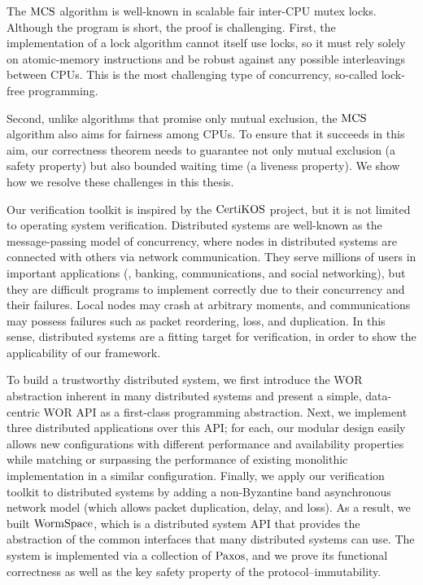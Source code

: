 The $\mathrm{MCS}$ algorithm is well-known in scalable fair inter-CPU mutex locks. 
Although the program is short, the proof is challenging. 
First, the implementation of a lock algorithm cannot itself use locks, so it must rely solely on atomic-memory instructions and be robust against any possible interleavings between CPUs. 
This is the most challenging type of concurrency, so-called lock-free programming. 

Second, unlike algorithms that promise only mutual exclusion, the $\mathrm{MCS}$ algorithm also aims for fairness among CPUs. 
To ensure that it succeeds in this aim, our correctness theorem needs to guarantee not only mutual exclusion (a safety property) but also bounded waiting time (a liveness property). 
We show how we resolve these challenges in this thesis. 

Our verification toolkit is inspired by the $\mathrm{CertiKOS}$ project, 
but it is not limited to operating system verification. 
Distributed systems are well-known as the message-passing model of concurrency, 
where nodes in distributed systems are connected with others via network communication. 
They serve millions of users in important applications (\ie, banking, communications, and social networking), 
but they are difficult programs to implement correctly due to their concurrency and their failures. 
Local nodes may crash at arbitrary moments, and communications may possess failures such as packet reordering, loss, and duplication. 
In this sense, distributed systems are a fitting target for verification, in order to show the applicability of our framework. 

To build a trustworthy distributed system, we first introduce the WOR abstraction inherent in many distributed systems and present a simple, 
data-centric WOR API as a first-class programming abstraction. 
Next, we implement three distributed applications over this API; for each, our modular design easily allows new configurations with different performance and availability properties while matching or surpassing the performance of existing monolithic implementation in a similar configuration. 
Finally, we apply our verification toolkit to distributed systems by adding a non-Byzantine band asynchronous network model (which allows packet duplication, delay, and loss). 
As a result, we built $\mathrm{WormSpace}$, which is a distributed system API that provides the abstraction of the common interfaces that many distributed systems can use. The system is implemented via a collection of $\mathrm{Paxos}$, and we prove its functional correctness as well as the key safety property of the protocol--immutability. 



